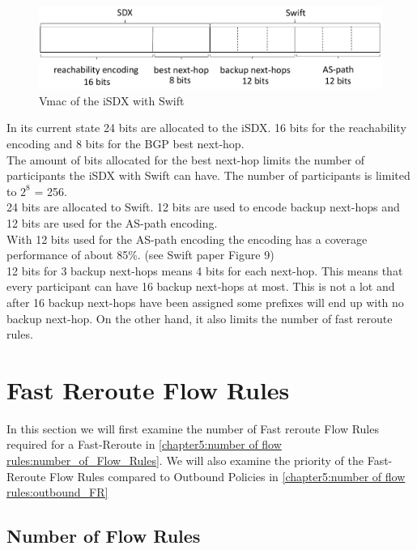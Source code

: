 \begin{figure}[h]
\center
\includegraphics[scale = 0.65]{Figures/eval_vmac_cropped2.pdf}
\caption{Vmac of the iSDX with Swift}
\end{figure}

In its current state 24 bits are allocated to the iSDX. 16 bits for the reachability encoding and 8 bits for the BGP best next-hop. \\
The amount of bits allocated for the best next-hop limits the number of participants the iSDX with Swift can have. The number of participants is limited to $2^8$ = 256. \\
24 bits are allocated to Swift. 12 bits are used to encode backup next-hops and 12 bits are used for the AS-path encoding. \\
With 12 bits used for the AS-path encoding the encoding has a coverage performance of about 85\%. (see Swift paper Figure 9)\\
12 bits for 3 backup next-hops means 4 bits for each next-hop. This means that every participant can have 16 backup next-hops at most. This is not a lot and after 16 backup next-hops have been assigned some prefixes will end up with no backup next-hop. On the other hand, it also limits the number of fast reroute rules. \\


\section{\label{chapter6:number of flow rules}Fast Reroute Flow Rules}

In this section we will first examine the number of Fast reroute Flow Rules required for a Fast-Reroute in \ref{chapter5:number of flow rules:number_of_Flow_Rules}. We will also examine the priority of the Fast-Reroute Flow Rules compared to Outbound Policies in \ref{chapter5:number of flow rules:outbound_FR}

\subsection{\label{chapter6:number of flow rules:number_of_Flow_Rules}Number of Flow Rules}

